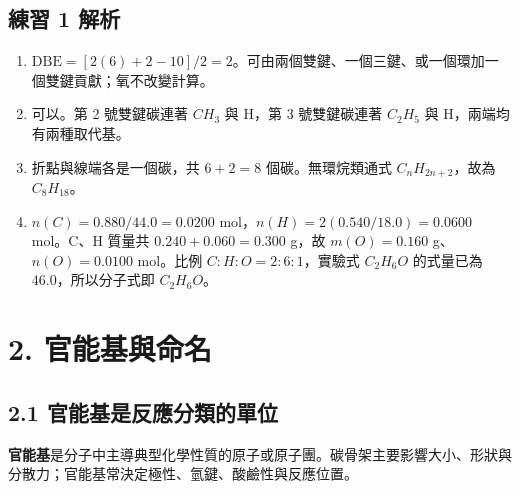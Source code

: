 \documentclass[11pt,a4paper]{article}
\providecommand{\tightlist}{%
  \setlength{\itemsep}{0pt}\setlength{\parskip}{0pt}}
\begin{document}
\subsection{練習 1 解析}\label{ux7df4ux7fd2-1-ux89e3ux6790}

\begin{enumerate}
\def\labelenumi{\arabic{enumi}.}
\tightlist
\item
  \(\mathrm{DBE}=[2(6)+2-10]/2=2\)。可由兩個雙鍵、一個三鍵、或一個環加一個雙鍵貢獻；氧不改變計算。
\item
  可以。第 2 號雙鍵碳連著 \(CH_3\) 與 H，第 3 號雙鍵碳連著 \(C_2H_5\) 與 H，兩端均有兩種取代基。
\item
  折點與線端各是一個碳，共 \(6+2=8\) 個碳。無環烷類通式 \(C_nH_{2n+2}\)，故為 \(C_8H_{18}\)。
\item
  \(n(C)=0.880/44.0=0.0200\) mol，\(n(H)=2(0.540/18.0)=0.0600\) mol。C、H 質量共 \(0.240+0.060=0.300\) g，故 \(m(O)=0.160\) g、\(n(O)=0.0100\) mol。比例 \(C:H:O=2:6:1\)，實驗式 \(C_2H_6O\) 的式量已為 \(46.0\)，所以分子式即 \(C_2H_6O\)。
\end{enumerate}

\section{2. 官能基與命名}\label{ux5b98ux80fdux57faux8207ux547dux540d}

\subsection{2.1 官能基是反應分類的單位}\label{ux5b98ux80fdux57faux662fux53cdux61c9ux5206ux985eux7684ux55aeux4f4d}

\textbf{官能基}是分子中主導典型化學性質的原子或原子團。碳骨架主要影響大小、形狀與分散力；官能基常決定極性、氫鍵、酸鹼性與反應位置。
\end{document}
